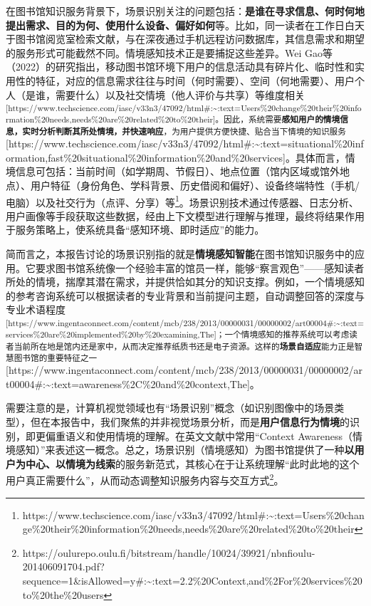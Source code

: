 \documentclass[
  letterpaper,
]{scrbook}
\begin{document}
在图书馆知识服务背景下，场景识别关注的问题包括：\textbf{是谁在寻求信息、何时何地提出需求、目的为何、使用什么设备、偏好如何}等。比如，同一读者在工作日白天于图书馆阅览室检索文献，与在深夜通过手机远程访问数据库，其信息需求和期望的服务形式可能截然不同。情境感知技术正是要捕捉这些差异。Wei
Gao等（2022）的研究指出，移动图书馆环境下用户的信息活动具有碎片化、临时性和实用性的特征，对应的信息需求往往与时间（何时需要）、空间（何地需要）、用户个人（是谁，需要什么）以及社交情境（他人评价与共享）等维度相关\textsuperscript{{[}https://www.techscience.com/iasc/v33n3/47092/html\#:\textasciitilde:text=Users\%20change\%20their\%20information\%20needs,needs\%20are\%20related\%20to\%20their{]}。因此，系统需要\textbf{感知用户的情境信息，实时分析判断其所处情境，并快速响应}，为用户提供方便快捷、贴合当下情境的知识服务}{[}https://www.techscience.com/iasc/v33n3/47092/html\#:\textasciitilde:text=situational\%20information,fast\%20situational\%20information\%20and\%20services{]}。具体而言，情境信息可包括：当前时间（如学期周、节假日）、地点位置（馆内区域或馆外地点）、用户特征（身份角色、学科背景、历史借阅和偏好）、设备终端特性（手机/电脑）以及社交行为（点评、分享）等\footnote{https://www.techscience.com/iasc/v33n3/47092/html\#:\textasciitilde:text=Users\%20change\%20their\%20information\%20needs,needs\%20are\%20related\%20to\%20their}。场景识别技术通过传感器、日志分析、用户画像等手段获取这些数据，经由上下文模型进行理解与推理，最终将结果作用于服务策略上，使系统具备``感知环境、即时适应''的能力。

简而言之，本报告讨论的场景识别指的就是\textbf{情境感知智能}在图书馆知识服务中的应用。它要求图书馆系统像一个经验丰富的馆员一样，能够``察言观色''------感知读者所处的情境，揣摩其潜在需求，并提供恰如其分的知识支撑。例如，一个情境感知的参考咨询系统可以根据读者的专业背景和当前提问主题，自动调整回答的深度与专业术语程度\textsuperscript{{[}https://www.ingentaconnect.com/content/mcb/238/2013/00000031/00000002/art00004\#:\textasciitilde:text=services\%20are\%20implemented\%20by\%20examining,The{]}；一个情境感知的推荐系统可以考虑读者当前所在地是馆内还是家中，从而决定推荐纸质书还是电子资源。这样的\textbf{场景自适应}能力正是智慧图书馆的重要特征之一}{[}https://www.ingentaconnect.com/content/mcb/238/2013/00000031/00000002/art00004\#:\textasciitilde:text=awareness\%2C\%20and\%20context,The{]}。

需要注意的是，计算机视觉领域也有``场景识别''概念（如识别图像中的场景类型），但在本报告中，我们聚焦的并非视觉场景分析，而是\textbf{用户信息行为情境}的识别，即更偏重语义和使用情境的理解。在英文文献中常用``Context
Awareness（情境感知）''来表述这一概念。总之，场景识别（情境感知）为图书馆提供了一种\textbf{以用户为中心、以情境为线索}的服务新范式，其核心在于让系统理解``此时此地的这个用户真正需要什么''，从而动态调整知识服务内容与交互方式\footnote{https://oulurepo.oulu.fi/bitstream/handle/10024/39921/nbnfioulu-201406091704.pdf?sequence=1\&isAllowed=y\#:\textasciitilde:text=2.2\%20Context,and\%2For\%20services\%20to\%20the\%20users}。
\end{document}
